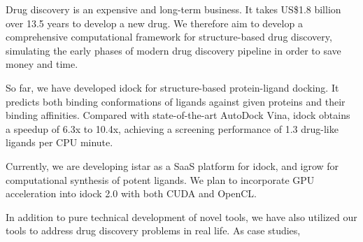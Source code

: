 Drug discovery is an expensive and long-term business. It takes US\$1.8 billion over 13.5 years to develop a new drug. We therefore aim to develop a comprehensive computational framework for structure-based drug discovery, simulating the early phases of modern drug discovery pipeline in order to save money and time.

So far, we have developed idock for structure-based protein-ligand docking. It predicts both binding conformations of ligands against given proteins and their binding affinities. Compared with state-of-the-art AutoDock Vina, idock obtains a speedup of 6.3x to 10.4x, achieving a screening performance of 1.3 drug-like ligands per CPU minute.

Currently, we are developing istar as a SaaS platform for idock, and igrow for computational synthesis of potent ligands.
We plan to incorporate GPU acceleration into idock 2.0 with both CUDA and OpenCL.

In addition to pure technical development of novel tools, we have also utilized our tools to address drug discovery problems in real life. As case studies, 
